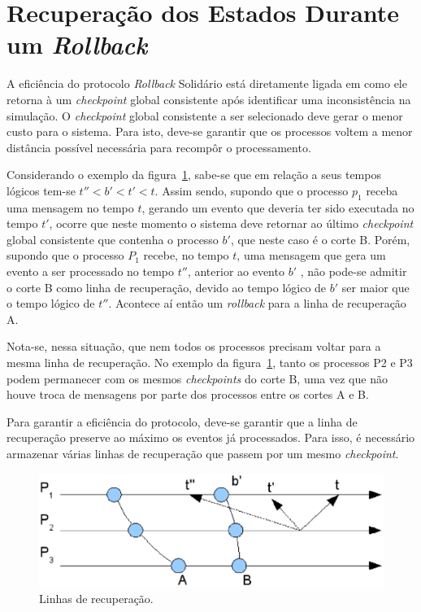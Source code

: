 \section{Recuperação dos Estados Durante um \textit{Rollback}}
A eficiência do protocolo \textit{Rollback} Solidário está diretamente ligada em como ele retorna à um \textit{checkpoint} global consistente após identificar uma inconsistência na simulação. O \textit{checkpoint} global consistente a ser selecionado deve gerar o menor custo para o sistema. Para isto, deve-se garantir que os processos voltem a menor distância possível necessária para recompôr o processamento.

	Considerando o exemplo da figura~\ref{fig:linhasrec}, sabe-se que em relação a seus tempos lógicos  tem-se $t''<b'<t'<t$. Assim sendo, supondo que o processo $p_{1}$ receba uma mensagem no tempo $t$, gerando um evento que deveria ter sido executada no tempo $t'$, ocorre que neste momento o sistema deve retornar ao último \textit{checkpoint} global consistente que contenha o processo $b'$, que neste caso é o corte B. Porém, supondo que o processo $P_1$ recebe, no tempo $t$, uma mensagem que gera um evento a ser processado no tempo $t''$, anterior ao evento $b'$ , não pode-se admitir o corte B como linha de recuperação, devido ao tempo lógico de $b'$ ser maior que o tempo lógico de $t''$. Acontece aí então um \textit{rollback} para a linha de recuperação A. 
	
	Nota-se, nessa situação, que nem todos os processos precisam voltar para a mesma linha de recuperação. No exemplo da figura~\ref{fig:linhasrec}, tanto os processos P2 e P3 podem permanecer com os mesmos \textit{checkpoints} do corte B, uma vez que não houve troca de mensagens por parte dos processos entre os cortes A e B.
	
	Para garantir a eficiência do protocolo, deve-se garantir que a linha de recuperação preserve ao máximo os eventos já processados. Para isso, é necessário armazenar várias linhas de recuperação que passem por um mesmo \textit{checkpoint}.

\begin{figure}[htb]
  \centerline{\includegraphics[scale=0.6]{cortes_rollback.eps}}
  \caption{Linhas de recuperação.}
\label{fig:linhasrec}
\end{figure}	


